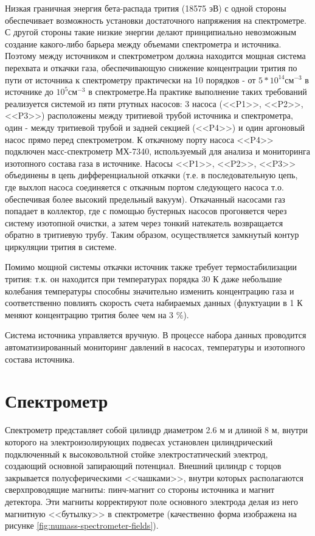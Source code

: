 \documentclass[a4paper,14pt]{extreport}
\begin{document}
Низкая граничная энергия бета-распада трития (18575 эВ) с одной стороны обеспечивает возможность установки достаточного напряжения на спектрометре. С другой стороны такие низкие энергии делают принципиально невозможным создание какого-либо барьера между объемами спектрометра и источника. Поэтому между источником и спектрометром должна находится мощная система перехвата и откачки газа, обеспечивающую снижение концентрации трития по пути от источника к спектрометру практически на 10 порядков - от $ 5 * 10^{14} \textbf{см}^{-3}$ в источнике до  $ 10^{5} \textbf{см}^{-3}$ в спектрометре.На практике выполнение таких требований реализуется системой из пяти ртутных насосов: 3 насоса (<<P1>>, <<P2>>, <<P3>>) расположены между тритиевой трубой источника и спектрометра, один - между тритиевой трубой и задней секцией (<<P4>>) и один аргоновый насос прямо перед спектрометром. К откачному порту насоса <<P4>> подключен масс-спектрометр МХ-7340, используемый для анализа и мониторинга изотопного состава газа в источнике. Насосы <<P1>>, <<P2>>, <<P3>> объединены в цепь дифференциальной откачки (т.е. в последовательную цепь, где выхлоп насоса соединяется с откачным портом следующего насоса т.о. обеспечивая более высокий предельный вакуум). Откачанный насосами газ попадает в коллектор, где с помощью бустерных насосов прогоняется через систему изотопной очистки, а затем через тонкий натекатель возвращается обратно в тритиевую трубу. Таким образом, осуществляется замкнутый контур циркуляции трития в системе.

Помимо мощной системы откачки источник также требует термостабилизации трития: т.к. он находится при температурах порядка 30 К даже небольшие колебания температуры способны значительно изменить концентрацию газа и соответственно повлиять скорость счета набираемых данных (флуктуации в 1 К меняют концентрацию трития более чем на 3 \%).

Система источника управляется вручную. В процессе набора данных проводится автоматизированный мониторинг давлений в насосах, температуры и изотопного состава источника.

\section{Спектрометр}
Спектрометр представляет собой цилиндр диаметром 2.6 м и длиной 8 м, внутри которого на электроизолирующих подвесах установлен цилиндрический подключенный к высоковольтной стойке электростатический электрод, создающий основной запирающий потенциал. Внешний цилиндр с торцов закрывается полусферическими <<чашками>>, внутри которых располагаются сверхпроводящие магниты: пинч-магнит со стороны источника и магнит детектора. Эти магниты корректируют поле основного электрода делая из него магнитную <<бутылку>> в спектрометре (качественно форма изображена на рисунке \ref{fig:numass-spectrometer-fields}).
\end{document}
